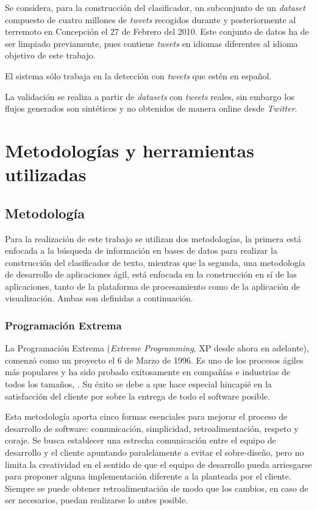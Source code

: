 Se considera, para la construcción del clasificador, un subconjunto de un \textit{dataset} compuesto de cuatro millones de \textit{tweets} recogidos durante y posteriormente al terremoto en Concepción el 27 de Febrero del 2010. Este conjunto de datos ha de ser limpiado previamente, pues contiene \textit{tweets} en idiomas diferentes al idioma objetivo de este trabajo.

El sistema sólo trabaja en la detección con \textit{tweets} que estén en español.

La validación se realiza a partir de \textit{datasets} con \textit{tweets} reales, sin embargo los flujos generados son sintéticos y no obtenidos de manera online desde \textit{Twitter}.

\section{Metodologías y herramientas utilizadas}
\label{intro:metodologia}

\subsection{Metodología}
\label{subsec:MetodologiaDetalle}

Para la realización de este trabajo se utilizan dos metodologías, la primera está enfocada a la búsqueda de información en bases de datos para realizar la construcción del clasificador de texto, mientras que la segunda, una metodología de desarrollo de aplicaciones ágil, está enfocada en la construcción en sí de las aplicaciones, tanto de la plataforma de procesamiento como de la aplicación de visualización. Ambas son definidas a continuación.

\subsubsection*{Programación Extrema}
\label{subsubsec:XP}

La Programación Extrema (\textit{Extreme Programming}, XP desde ahora en adelante), comenzó como un proyecto el 6 de Marzo de 1996. Es uno de los procesos ágiles más populares y ha sido probado exitosamente en compañías e industrias de todos los tamaños, \citep{XP}. Su éxito se debe a que hace especial hincapié en la satisfacción del cliente por sobre la entrega de todo el software posible.

Esta metodología aporta cinco formas esenciales para mejorar el proceso de desarrollo de software: comunicación, simplicidad, retroalimentación, respeto y coraje. Se busca establecer una estrecha comunicación entre el equipo de desarrollo y el cliente apuntando paralelamente a evitar el sobre-diseño, pero no limita la creatividad en el sentido de que el equipo de desarrollo pueda arriesgarse para proponer alguna implementación diferente a la planteada por el cliente. Siempre se puede obtener retroalimentación de modo que los cambios, en caso de ser necesarios, puedan realizarse lo antes posible. 

